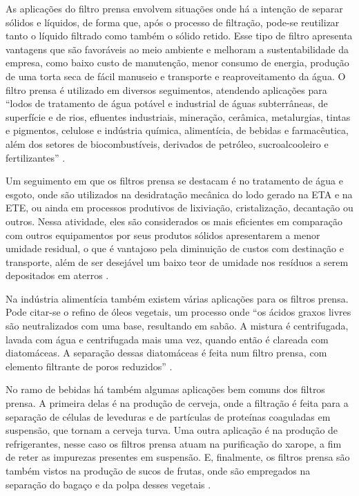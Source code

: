 As aplicações do filtro prensa envolvem situações onde há a intenção de separar
sólidos e líquidos, de forma que, após o processo de filtração, pode-se
reutilizar tanto o líquido filtrado como também o sólido retido. Esse tipo de
filtro apresenta vantagens que são favoráveis ao meio ambiente e melhoram a
sustentabilidade da empresa, como baixo custo de manutenção, menor consumo de
energia, produção de uma torta seca de fácil manuseio e transporte e
reaproveitamento da água. O filtro prensa é utilizado em diversos seguimentos,
atendendo aplicações para ``lodos de tratamento de água potável e industrial de
águas subterrâneas, de superfície e de rios, efluentes industriais, mineração,
cerâmica, metalurgias, tintas e pigmentos, celulose e indústria química,
alimentícia, de bebidas e farmacêutica, além dos setores de biocombustíveis,
derivados de petróleo, sucroalcooleiro e fertilizantes'' .

Um seguimento em que os filtros prensa se destacam é no tratamento de água e
esgoto, onde são utilizados na desidratação mecânica do lodo gerado na ETA e na
ETE, ou ainda em processos produtivos de lixiviação, cristalização, decantação
ou outros. Nessa atividade, eles são considerados os mais eficientes em
comparação com outros equipamentos por seus produtos sólidos apresentarem a
menor umidade residual, o que é vantajoso pela diminuição de custos com
destinação e transporte, além de ser desejável um baixo teor de umidade nos
resíduos a serem depositados em aterros .

Na indústria alimentícia também existem várias aplicações para os filtros
prensa. Pode citar-se o refino de óleos vegetais, um processo onde ``os ácidos
graxos livres são neutralizados com uma base, resultando em sabão. A mistura é
centrifugada, lavada com água e centrifugada mais uma vez, quando então é
clareada com diatomáceas. A separação dessas diatomáceas é feita num filtro
prensa, com elemento filtrante de poros reduzidos'' .

No ramo de bebidas há também algumas aplicações bem comuns dos filtros prensa. A
primeira delas é na produção de cerveja, onde a filtração é feita para a
separação de células de leveduras e de partículas de proteínas coaguladas em
suspensão, que tornam a cerveja turva. Uma outra aplicação é na produção de
refrigerantes, nesse caso os filtros prensa atuam na purificação do xarope, a
fim de reter as impurezas presentes em suspensão. E, finalmente, os filtros
prensa são também vistos na produção de sucos de frutas, onde são empregados na
separação do bagaço e da polpa desses vegetais .

